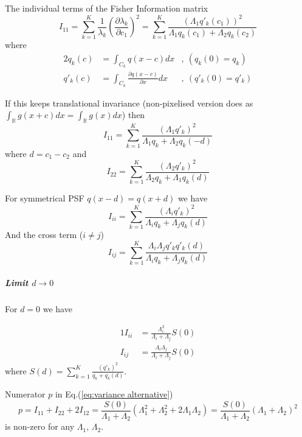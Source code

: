 The individual terms of the Fisher Information matrix 
%
\begin{equation}
	I_{11}=\sum_{k=1}^{K}\frac{1}{\lambda_{k}}\left(\frac{\partial\lambda_{k}}{\partial c_{1}}\right)^{2}=\sum_{k=1}^{K}\frac{\left(\Lambda_{1}q'_{k}(c_{1})\right)^{2}}{\Lambda_{1}q_{k}(c_{1})+\Lambda_{2}q_{k}(c_{2})}
\end{equation}
%
where
%
\begin{alignat*}{2}
	q_{k}(c) & =\int_{C_{k}}q(x-c)dx & ,\ (q_{k}(0)=q_{k})\\
	q'_{k}(c) & =\int_{C_{k}}\frac{\partial q(x-c)}{\partial x}dx & ,\ (q'_{k}(0)=q'_{k})
\end{alignat*}

If this keeps translational invariance (non-pixelised version does as $\int_{\mathbb{R}}g(x+c)dx=\int_{\mathbb{R}}g(x)dx$) then 
%
\begin{equation}
	I_{11}=\sum_{k=1}^{K}\frac{\left(\Lambda_{1}q'_{k}\right)^{2}}{\Lambda_{1}q_{k}+\Lambda_{2}q_{k}(-d)}
\end{equation}
%
where $d=c_{1}-c_{2}$ and 
%
\begin{equation}
	I_{22}=\sum_{k=1}^{K}\frac{\left(\Lambda_{2}q'_{k}\right)^{2}}{\Lambda_{2}q_{k}+\Lambda_{1}q_{k}(d)}
\end{equation}

For symmetrical PSF $q(x-d)=q(x+d)$ we have 
%
\begin{equation}
	I_{ii}=\sum_{k=1}^{K}\frac{\left(\Lambda_{i}q'_{k}\right)^{2}}{\Lambda_{i}q_{k}+\Lambda_{j}q_{k}(d)}
	\label{eq:Fisher Information alternative - Individual}
\end{equation}
%
And the cross term ($i\neq j$) 
%
\begin{equation}
	I_{ij}=\sum_{k=1}^{K}\frac{\Lambda_{i}\Lambda_{j}q'_{k}q'_{k}(d)}{\Lambda_{i}q_{k}+\Lambda_{j}q_{k}(d)}
\end{equation}

\subparagraph{Limit $d\rightarrow0$}

For $d=0$ we have

\begin{alignat*}{1}
	I_{ii} & =\frac{\Lambda_{i}^{2}}{\Lambda_{i}+\Lambda_{j}}S(0)\\
	I_{ij} & =\frac{\Lambda_{i}\Lambda_{j}}{\Lambda_{i}+\Lambda_{j}}S(0)
\end{alignat*}
%
where $S(d)=\sum_{k=1}^{K}\frac{\left(q'_{k}\right)^{2}}{q_{k}+q_{k}(d)}$. 

Numerator $p$ in Eq.(\ref{eq:variance alternative}) 
%
\begin{equation}
	p=I_{11}+I_{22}+2I_{12}=\frac{S(0)}{\Lambda_{1}+\Lambda_{2}}(\Lambda_{1}^{2}+\Lambda_{2}^{2}+2\Lambda_{1}\Lambda_{2})=\frac{S(0)}{\Lambda_{1}+\Lambda_{2}}(\Lambda_{1}+\Lambda_{2})^{2}
\end{equation}
%
is non-zero for any $\Lambda_{1},\,\Lambda_{2}$.

